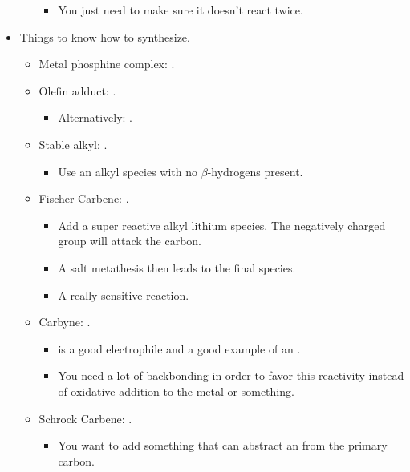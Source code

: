 \documentclass[../notes.tex]{subfiles}
\begin{document}
\begin{itemize}
\begin{itemize}
        \begin{itemize}
            \item You just need to make sure it doesn't react twice.
        \end{itemize}
    \end{itemize}
    \item Things to know how to synthesize.
    \begin{itemize}
        \item Metal phosphine complex: .
        \item Olefin adduct: .
        \begin{itemize}
            \item Alternatively: .
        \end{itemize}
        \item Stable alkyl: .
        \begin{itemize}
            \item Use an alkyl species with no $\beta$-hydrogens present.
        \end{itemize}
        \item Fischer Carbene: .
        \begin{itemize}
            \item Add a super reactive alkyl lithium species. The negatively charged  group will attack the carbon.
            \item A salt metathesis then leads to the final species.
            \item A really sensitive reaction.
        \end{itemize}
        \item Carbyne: .
        \begin{itemize}
            \item {} is a good electrophile and a good example of an .
            \item You need a lot of backbonding in order to favor this reactivity instead of oxidative addition to the metal or something.
        \end{itemize}
        \item Schrock Carbene: .
        \begin{itemize}
            \item You want to add something that can abstract an  from the primary carbon.

\end{itemize}
\end{itemize}
\end{itemize}
\end{document}
